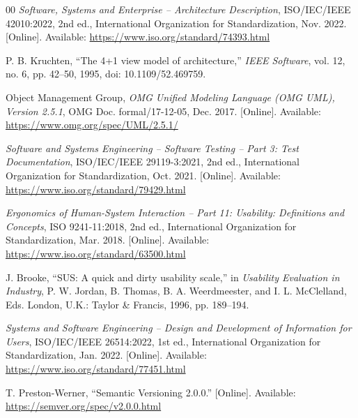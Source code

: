 \documentclass{article}
\begin{document}
\begin{thebibliography}{00}
\textit{Software, Systems and Enterprise -- Architecture Description}, ISO/IEC/IEEE 42010:2022, 2nd ed., International Organization for Standardization, Nov. 2022. [Online]. Available: \url{https://www.iso.org/standard/74393.html}

P. B. Kruchten, “The 4+1 view model of architecture,” \textit{IEEE Software}, vol. 12, no. 6, pp. 42--50, 1995, doi: 10.1109/52.469759.

Object Management Group, \textit{OMG Unified Modeling Language (OMG UML), Version 2.5.1}, OMG Doc. formal/17-12-05, Dec. 2017. [Online]. Available: \url{https://www.omg.org/spec/UML/2.5.1/}

\textit{Software and Systems Engineering -- Software Testing -- Part 3: Test Documentation}, ISO/IEC/IEEE 29119-3:2021, 2nd ed., International Organization for Standardization, Oct. 2021. [Online]. Available: \url{https://www.iso.org/standard/79429.html}

\textit{Ergonomics of Human-System Interaction -- Part 11: Usability: Definitions and Concepts}, ISO 9241-11:2018, 2nd ed., International Organization for Standardization, Mar. 2018. [Online]. Available: \url{https://www.iso.org/standard/63500.html}

J. Brooke, “SUS: A quick and dirty usability scale,” in \textit{Usability Evaluation in Industry}, P. W. Jordan, B. Thomas, B. A. Weerdmeester, and I. L. McClelland, Eds. London, U.K.: Taylor \& Francis, 1996, pp. 189--194.

\textit{Systems and Software Engineering -- Design and Development of Information for Users}, ISO/IEC/IEEE 26514:2022, 1st ed., International Organization for Standardization, Jan. 2022. [Online]. Available: \url{https://www.iso.org/standard/77451.html}

T. Preston-Werner, “Semantic Versioning 2.0.0.” [Online]. Available: \url{https://semver.org/spec/v2.0.0.html}

\end{thebibliography}
\end{document}

